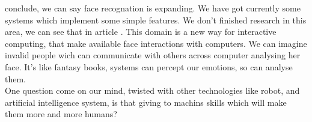  conclude, we can say face recognation is expanding. We have got currently some systems which implement some simple features. We don't finished research in this area, we can see that in article \cite{lala}. This domain is a new way for interactive computing, that make available face interactions with computers. We can imagine invalid people wich can communicate with others across computer analysing her face. It's like fantasy books, systems can percept our emotions, so can analyse them. \\
One question come on our mind, twisted with other technologies like robot, and artificial intelligence system, is that giving to machins skills which will make them more and more humans?\\
